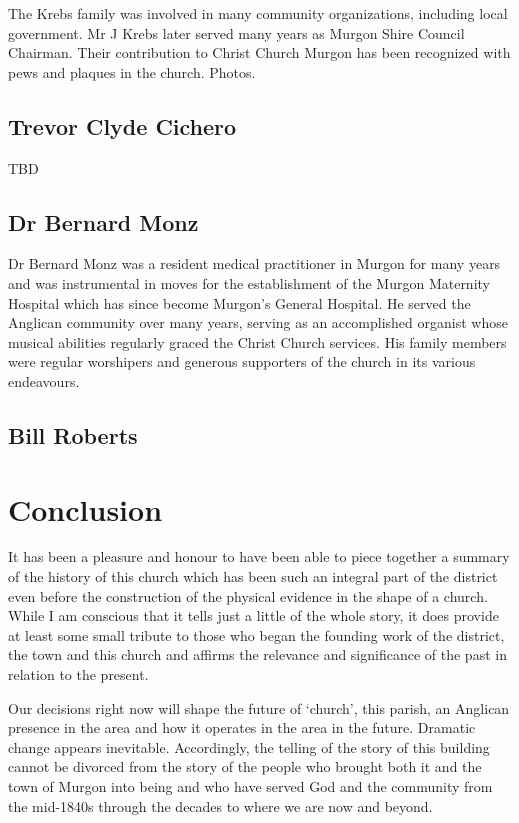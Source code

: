 The Krebs family was involved in many community organizations, including
local government. Mr J Krebs later served many years as Murgon Shire
Council Chairman. Their contribution to Christ Church Murgon has been
recognized with pews and plaques in the church. Photos.

\hypertarget{trevor-clyde-cichero}{%
\section{Trevor Clyde Cichero}\label{trevor-clyde-cichero}}

TBD

\hypertarget{dr-bernard-monz}{%
\section{Dr Bernard Monz}\label{dr-bernard-monz}}

Dr Bernard Monz was a resident medical practitioner in Murgon for many
years and was instrumental in moves for the establishment of the Murgon
Maternity Hospital which has since become Murgon's General Hospital. He
served the Anglican community over many years, serving as an
accomplished organist whose musical abilities regularly graced the
Christ Church services. His family members were regular worshipers and
generous supporters of the church in its various endeavours.

\hypertarget{bill-roberts}{%
\section{Bill Roberts}\label{bill-roberts}}

\hypertarget{conclusion}{%
\chapter{Conclusion}\label{conclusion}}

It has been a pleasure and honour to have been able to piece together a
summary of the history of this church which has been such an integral
part of the district even before the construction of the physical
evidence in the shape of a church. While I am conscious that it tells
just a little of the whole story, it does provide at least some small
tribute to those who began the founding work of the district, the town
and this church and affirms the relevance and significance of the past
in relation to the present.

Our decisions right now will shape the future of `church', this parish,
an Anglican presence in the area and how it operates in the area in the
future. Dramatic change appears inevitable. Accordingly, the telling of
the story of this building cannot be divorced from the story of the
people who brought both it and the town of Murgon into being and who
have served God and the community from the mid-1840s through the decades
to where we are now and beyond.

